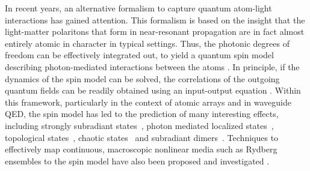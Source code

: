 \documentclass[pra,twocolumn,showpacs,preprintnumbers,amsmath,amssymb]{revtex4-1}
\begin{document}
In recent years, an alternative formalism to capture quantum atom-light interactions has gained attention. This formalism is based on the insight that the light-matter polaritons that form in near-resonant propagation are in fact almost entirely atomic in character in typical settings. Thus, the photonic degrees of freedom can be effectively integrated out, to yield a quantum spin model describing photon-mediated interactions between the atoms \cite{anapra,anaprx,ana_masson,rev_wqedarray}. In principle, if the dynamics of the spin model can be solved, the correlations of the outgoing quantum fields can be readily obtained using an input-output equation \cite{Caneva,MPSJames,Caneva, MPSJames,glauber,Blais_in}. Within this framework, particularly in the context of atomic arrays and in waveguide QED, the spin model has led to the prediction of many interesting effects, including strongly subradiant states~\cite{Albrecht,Loic,ritch,dimermolmer1,zhang,buchler,dimer_shermet,Pod_scat,Pod_3,Lesanosky,Yudson}, photon mediated localized states~\cite{Pod_photon_loc}, topological states~\cite{Pod_topo}, chaotic states~\cite{caos} and subradiant dimers~\cite{dimermolmer2,dimer_poddu}. Techniques to effectively map continuous, macroscopic nonlinear media such as Rydberg ensembles to the spin model have also been proposed and investigated \cite{james_ryd}. 
\end{document}
